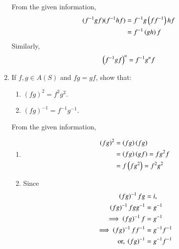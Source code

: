 \begin{enumerate}[label=\arabic*.,ref=\thesubsection.\theenumi]
\solution  From the given information, 
		\begin{align}
			(f^{-1}gf)(f^{-1}hf) &= 
			f^{-1}g\left(ff^{-1}\right)hf 
\\
			&			= 
			f^{-1}\left(gh\right)f  
		\end{align}
		Similarly,
		\begin{align}
			\left(f^{-1}gf\right)^n = 
			f^{-1}g^n  f
		\end{align}
	\item If $f, g \in A (S)$ and $fg = gf$, show that:
		\label{prob:1.4.5}
\begin{enumerate}
	\item  $(fg)^2 = f^2g^2$.
	\item  $(fg)^{-1} = f^{-1}g^{-1}$.
\end{enumerate}
\solution From the given information, 
\begin{enumerate}
	\item  
		\begin{align}
			(fg)^2 &= \left(fg\right)\left(fg\right)
			\\
			 &= \left(fg\right)\left(gf\right) = fg^2f
			\\
			 &=  f\left(fg^2\right) = f^2g^2
		\end{align}
	\item  Since 
		\begin{align}
			\left(fg\right)^{-1}f g&= i,
			\\
			\left(fg\right)^{-1}fgg^{-1} &= g^{-1}
			\\
	\implies 	
			\left(fg\right)^{-1}f &= g^{-1}
			\\
			\implies \left(fg\right)^{-1} ff^{-1}&= g^{-1}f^{-1}
			\\
			\text{or, }\left(fg\right)^{-1} &= g^{-1}f^{-1}
		\end{align}


\end{enumerate}
\end{enumerate}
